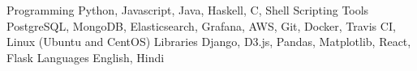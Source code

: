 
\begin{cvskills}

  \cvskill
    {Programming}
    {Python, Javascript, Java, Haskell, C, Shell Scripting}
  \cvskill
    {Tools}
    {PostgreSQL, MongoDB, Elasticsearch, Grafana, AWS, Git, Docker, Travis CI, Linux (Ubuntu and CentOS)}
  \cvskill
    {Libraries}
    {Django, D3.js, Pandas, Matplotlib, React, Flask}
  \cvskill
    {Languages}
    {English, Hindi}
\end{cvskills}
